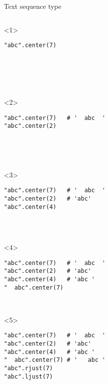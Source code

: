 \begin{frame}[fragile]{Text sequence type}

  \begin{columns}[onlytextwidth]
    \begin{column}{\textwidth}

      \begin{onlyenv}<1>
        \begin{lstlisting}[style=python]
"abc".center(7)






 \end{lstlisting}
      \end{onlyenv}

      \begin{onlyenv}<2>
        \begin{lstlisting}[style=python]
"abc".center(7)   # '  abc  '
"abc".center(2)





 \end{lstlisting}
      \end{onlyenv}

      \begin{onlyenv}<3>
        \begin{lstlisting}[style=python]
"abc".center(7)   # '  abc  '
"abc".center(2)   # 'abc'
"abc".center(4)




 \end{lstlisting}
      \end{onlyenv}

      \begin{onlyenv}<4>
        \begin{lstlisting}[style=python]
"abc".center(7)   # '  abc  '
"abc".center(2)   # 'abc'
"abc".center(4)   # 'abc '
"  abc".center(7)



 \end{lstlisting}
      \end{onlyenv}

      \begin{onlyenv}<5>
        \begin{lstlisting}[style=python]
"abc".center(7)   # '  abc  '
"abc".center(2)   # 'abc'
"abc".center(4)   # 'abc '
"  abc".center(7) # '   abc '
"abc".rjust(7)
"abc".ljust(7)

 \end{lstlisting}
      \end{onlyenv}


\end{column}
\end{columns}
\end{frame}
